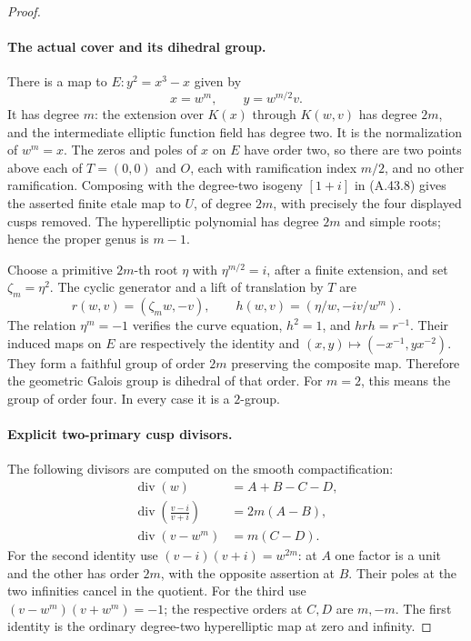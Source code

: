 \begin{proof}
\paragraph{The actual cover and its dihedral group.}
There is a map to \(E:y^2=x^3-x\) given by
\[
                 x=w^m,\qquad y=w^{m/2}v.            \tag{A.44.3}
\]
It has degree \(m\): the extension over \(K(x)\)
through \(K(w,v)\) has degree \(2m\), and the
intermediate elliptic function field has degree two.
It is the normalization of \(w^m=x\). The zeros
and poles of \(x\) on \(E\) have order two, so
there are two points above each of \(T=(0,0)\) and
\(O\), each with ramification index \(m/2\), and
no other ramification. Composing with the degree-two
isogeny \([1+i]\) in (A.43.8) gives the asserted
finite etale map to \(U\), of degree \(2m\),
with precisely the four displayed cusps removed.
The hyperelliptic polynomial has degree \(2m\) and
simple roots; hence the proper genus is \(m-1\).

Choose a primitive \(2m\)-th root \(\eta\) with
\(\eta^{m/2}=i\), after a finite extension, and set
\(\zeta_m=\eta^2\). The cyclic generator and a
lift of translation by \(T\) are
\[
 r(w,v)=(\zeta_m w,-v),
 \qquad h(w,v)=(\eta/w,-i v/w^m).                   \tag{A.44.4}
\]
The relation \(\eta^m=-1\) verifies the curve
equation, \(h^2=1\), and \(hrh=r^{-1}\).
Their induced maps on \(E\) are respectively the
identity and \((x,y)\mapsto(-x^{-1},yx^{-2})\).
They form a faithful group of order \(2m\) preserving
the composite map. Therefore the geometric Galois group
is dihedral of that order. For \(m=2\), this means
the group of order four. In every case it is a
\(2\)-group.

\paragraph{Explicit two-primary cusp divisors.}
The following divisors are computed on the smooth
compactification:
\[
 \begin{split}
 \operatorname{div}(w)&=A+B-C-D,\\
 \operatorname{div}\left(\frac{v-i}{v+i}\right)&=2m(A-B),\\
 \operatorname{div}(v-w^m)&=m(C-D).                  \tag{A.44.5}
 \end{split}
\]
For the second identity use
\((v-i)(v+i)=w^{2m}\): at \(A\) one factor
is a unit and the other has order \(2m\), with
the opposite assertion at \(B\). Their poles at
the two infinities cancel in the quotient. For the
third use \((v-w^m)(v+w^m)=-1\); the respective
orders at \(C,D\) are \(m,-m\).
The first identity is the ordinary degree-two
hyperelliptic map at zero and infinity.


\end{proof}
